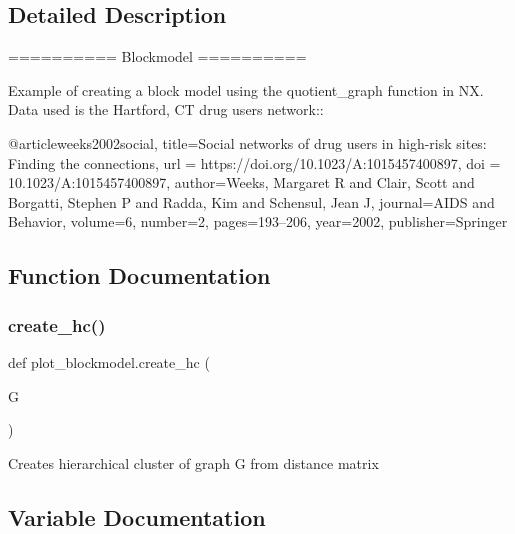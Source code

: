\subsection{Detailed Description}
\begin{DoxyVerb}==========
Blockmodel
==========

Example of creating a block model using the quotient_graph function in NX.  Data
used is the Hartford, CT drug users network::

@article{weeks2002social,
  title={Social networks of drug users in high-risk sites: Finding the connections},
  url = {https://doi.org/10.1023/A:1015457400897},
  doi = {10.1023/A:1015457400897},
  author={Weeks, Margaret R and Clair, Scott and Borgatti, Stephen P and Radda, Kim and Schensul, Jean J},
  journal={{AIDS and Behavior}},
  volume={6},
  number={2},
  pages={193--206},
  year={2002},
  publisher={Springer}
}\end{DoxyVerb}
 

\subsection{Function Documentation}
\mbox{\label{namespaceplot__blockmodel_a39fd3ba7c59f33a7e9117efa06c37cc7}} 
\subsubsection{\texorpdfstring{create\+\_\+hc()}{create\_hc()}}
{\footnotesize\ttfamily def plot\+\_\+blockmodel.\+create\+\_\+hc (\begin{DoxyParamCaption}\item[{}]{G }\end{DoxyParamCaption})}

\begin{DoxyVerb}Creates hierarchical cluster of graph G from distance matrix\end{DoxyVerb}
 

\subsection{Variable Documentation}
\mbox{\label{namespaceplot__blockmodel_af45cd66289ef1c26af661fc6084e6a76}} 
